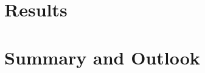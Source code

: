 \documentclass[12pt,a4paper,reqno,twoside,final]{scrbook}%
\numberwithin{equation}{subsection}
\begin{document}
\chapter{Results}
\label{ch:results}



\chapter*{Summary and Outlook}
\label{ch:summary}
%


%



\backmatter \appendix
\end{document}
